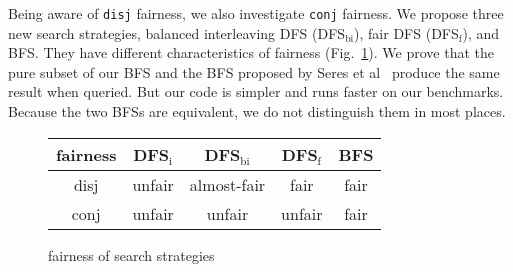 \documentclass[format=acmlarge, review=true, authordraft=true]{acmart}
\newcommand{\conde}{\texttt{cond$^e$} }
\begin{document}
Being aware of \texttt{disj} fairness, we also investigate \texttt{conj} 
fairness. 
We propose three new search strategies, balanced interleaving DFS (DFS$_\textrm{bi}$), fair 
DFS (DFS$_\textrm{f}$), and BFS. They have different characteristics of fairness 
(Fig.~\ref{fairness}). We prove that the pure subset of our BFS and the BFS 
proposed by Seres et
al~\citep{seres1999algebra} produce the same result when queried. But our code 
is simpler and runs faster on our benchmarks. Because the two BFSs are equivalent,
we do not distinguish them in most places.
 
\begin{figure}[tbp]
	\begin{tabular}{|c|c|c|c|c|}
		\hline 
		fairness & DFS$_\textrm{i}$ & DFS$_\textrm{bi}$ & DFS$_\textrm{f}$ & BFS \\ 
		\hline 
		disj & unfair & almost-fair & fair & fair \\ 
		\hline 
		conj & unfair & unfair & unfair & fair \\ 
		\hline 
	\end{tabular} 
	\caption{fairness of search strategies}
	\label{fairness}
\end{figure}

\end{document}
